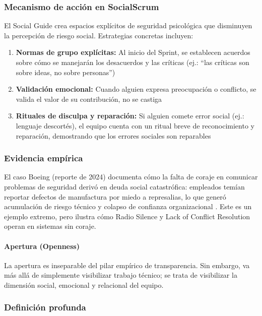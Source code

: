 \subsubsection*{Mecanismo de acción en SocialScrum}

El Social Guide crea espacios explícitos de seguridad psicológica que disminuyen la percepción de riesgo social. Estrategias concretas incluyen:
\begin{enumerate}
\item \textbf{Normas de grupo explícitas:} Al inicio del Sprint, se establecen acuerdos sobre cómo se manejarán los desacuerdos y las críticas (ej.: ``las críticas son sobre ideas, no sobre personas'')
\item \textbf{Validación emocional:} Cuando alguien expresa preocupación o conflicto, se valida el valor de su contribución, no se castiga
\item \textbf{Rituales de disculpa y reparación:} Si alguien comete error social (ej.: lenguaje descortés), el equipo cuenta con un ritual breve de reconocimiento y reparación, demostrando que los errores sociales son reparables
\end{enumerate}

\subsubsection*{Evidencia empírica}

El caso Boeing (reporte de 2024) documenta cómo la falta de coraje en comunicar problemas de seguridad derivó en deuda social catastrófica: empleados temían reportar defectos de manufactura por miedo a represalias, lo que generó acumulación de riesgo técnico y colapso de confianza organizacional \cite{saeeda2024nontechnicaldebt}. Este es un ejemplo extremo, pero ilustra cómo Radio Silence y Lack of Conflict Resolution operan en sistemas sin coraje.

\paragraph{Apertura (Openness)}

La apertura es inseparable del pilar empírico de transparencia. Sin embargo, va más allá de simplemente visibilizar trabajo técnico; se trata de visibilizar la dimensión social, emocional y relacional del equipo.

\subsubsection*{Definición profunda}

